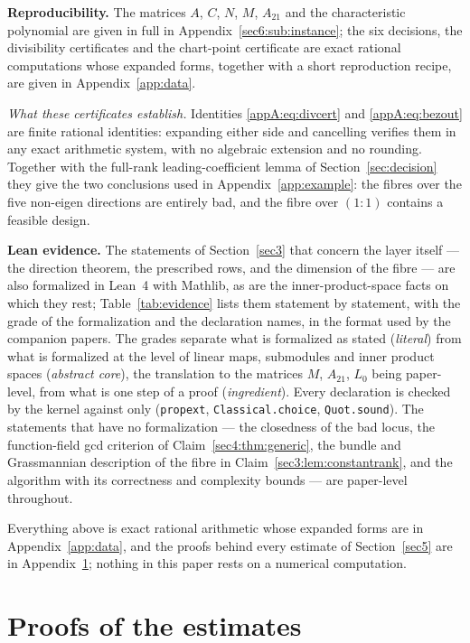 \documentclass[journal]{IEEEtran}
\theoremstyle{plainn}
\theoremstyle{remark}
\begin{document}
\textbf{Reproducibility.} The matrices $A$, $C$, $N$, $M$, $A_{21}$ and the characteristic polynomial
are given in full in Appendix~\ref{sec6:sub:instance}; the six decisions, the divisibility certificates
and the chart-point certificate are exact rational computations whose expanded forms, together with a
short reproduction recipe, are given in Appendix~\ref{app:data}.

\emph{What these certificates establish.} Identities \eqref{appA:eq:divcert} and
\eqref{appA:eq:bezout} are finite rational identities: expanding either side and cancelling verifies
them in any exact arithmetic system, with no algebraic extension and no rounding. Together with the
full-rank leading-coefficient lemma of Section~\ref{sec:decision} they give the two conclusions used in
Appendix~\ref{app:example}: the fibres over the five non-eigen directions are entirely bad, and
the fibre over $(1\!:\!1)$ contains a feasible design.

\textbf{Lean evidence.} The statements of Section~\ref{sec3} that concern the layer itself --- the
direction theorem, the prescribed rows, and the dimension of the fibre --- are also formalized in
Lean~4 with Mathlib, as are the inner-product-space facts on which they rest;
Table~\ref{tab:evidence} lists them statement by statement, with the grade of the formalization and
the declaration names, in the format used by the companion papers. The grades separate what is
formalized as stated (\emph{literal}) from what is formalized at the level of linear maps, submodules
and inner product spaces (\emph{abstract core}), the translation to the matrices $M$, $A_{21}$, $L_0$
being paper-level, from what is one step of a proof (\emph{ingredient}). Every declaration is checked
by the kernel against only (\texttt{propext}, \texttt{Classical.choice}, \texttt{Quot.sound}). The
statements that have no formalization --- the closedness of the bad locus, the function-field gcd
criterion of Claim~\ref{sec4:thm:generic}, the bundle and Grassmannian description of the fibre in
Claim~\ref{sec3:lem:constantrank}, and the algorithm with its correctness and complexity bounds --- are
paper-level throughout.

Everything above is exact rational arithmetic whose expanded forms are in Appendix~\ref{app:data}, and
the proofs behind every estimate of Section~\ref{sec5} are in Appendix~\ref{appBC}; nothing in this
paper rests on a numerical computation.


\appendices
\small
\section{Proofs of the estimates}\label{appBC}\label{appB}\label{app:subresultant}
\end{document}

